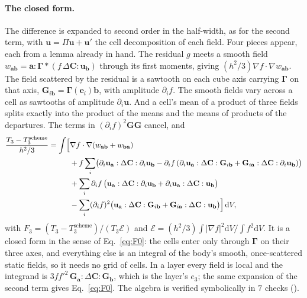 \documentclass[11pt,a4paper]{article}
\newcommand{\cE}{\mathcal{E}}
\newcommand{\dd}{\mathrm{d}}
\begin{document}
\paragraph{The closed form.} The difference is expanded to second order in the half-width, as for
the second term, with $\mathbf{u}=\Pi\mathbf{u}+\mathbf{u}'$ the cell decomposition of each field. Four
pieces appear, each from a lemma already in hand. The residual $g$ meets a smooth field
$w_{\mathbf{ab}}=\mathbf{a}:\boldsymbol\Gamma*(f\,\Delta\mathbf{C}:\mathbf{u}_{\mathbf{b}})$ through its first
moments, giving $(h^2/3)\nabla f\cdot\nabla w_{\mathbf{ab}}$. The field scattered by the residual is a
sawtooth on each cube axis carrying $\boldsymbol\Gamma$ on that axis,
$\mathbf{G}_{i\mathbf{b}}=\boldsymbol\Gamma(\mathbf{e}_i)\mathbf{b}$, with amplitude $\partial_if$. The
smooth fields vary across a cell as sawtooths of amplitude $\partial_i\mathbf{u}$. And a cell's mean of
a product of three fields splits exactly into the product of the means and the means of products of
the departures. The terms in $(\partial_if)^2\mathbf{G}\mathbf{G}$ cancel, and
\begin{equation}\label{eq:F3}
\begin{split}
  \frac{T_3-T_3^{\mathrm{scheme}}}{h^2/3}=\int\Bigl[&\nabla f\cdot\nabla(w_{\mathbf{ab}}+w_{\mathbf{ba}})\\
  &+f\sum_i\bigl(\partial_i\mathbf{u}_{\mathbf{a}}:\Delta\mathbf{C}:\partial_i\mathbf{u}_{\mathbf{b}}
     -\partial_if\,(\partial_i\mathbf{u}_{\mathbf{a}}:\Delta\mathbf{C}:\mathbf{G}_{i\mathbf{b}}
     +\mathbf{G}_{i\mathbf{a}}:\Delta\mathbf{C}:\partial_i\mathbf{u}_{\mathbf{b}})\bigr)\\
  &+\sum_i\partial_if\,\bigl(\mathbf{u}_{\mathbf{a}}:\Delta\mathbf{C}:\partial_i\mathbf{u}_{\mathbf{b}}
     +\partial_i\mathbf{u}_{\mathbf{a}}:\Delta\mathbf{C}:\mathbf{u}_{\mathbf{b}}\bigr)\\
  &-\sum_i(\partial_if)^2\bigl(\mathbf{u}_{\mathbf{a}}:\Delta\mathbf{C}:\mathbf{G}_{i\mathbf{b}}
     +\mathbf{G}_{i\mathbf{a}}:\Delta\mathbf{C}:\mathbf{u}_{\mathbf{b}}\bigr)\Bigr]\,\dd V,
\end{split}
\end{equation}
with $F_3=(T_3-T_3^{\mathrm{scheme}})/(T_3\cE)$ and $\cE=(h^2/3)\int\lvert\nabla f\rvert^2\dd V/\int
f^2\dd V$. It is a closed form in the sense of Eq.~\eqref{eq:F0}: the cells enter only through
$\boldsymbol\Gamma$ on their three axes, and everything else is an integral of the body's smooth,
once-scattered static fields, so it needs no grid of cells. In a layer every field is local and the
integrand is $3ff'^2\,\mathbf{G}_{\mathbf{a}}:\Delta\mathbf{C}:\mathbf{G}_{\mathbf{b}}$, which is the
layer's $e_3$; the same expansion of the second term gives Eq.~\eqref{eq:F0}. The algebra is verified
symbolically in $7$ checks ().
\end{document}
